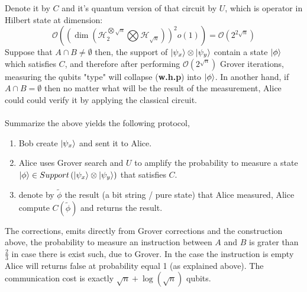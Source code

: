 \documentclass{article}
\newcommand{\onotation}[1]{\(\mathcal{O} \left( {#1}  \right) \)}
\newcommand{\ona}[1]{\onotation{#1}}
\begin{document}
Denote it by \( C \) and it's quantum version of that circuit by \( U \), which is operator in Hilbert state at dimension: \[ \mathcal{O} \left( \left( \dim \left( \mathcal{H}_{2}^{\bigotimes \sqrt{n}} \bigotimes \mathcal{H}_{\sqrt{n}} \right) \right) ^2 o(1) \right) = \mathcal{O} \left( 2^{2\sqrt{n}}  \right)  \]
Suppose that \( A \cap B \neq \emptyset \) then, the support of \( \ket{\psi_x} \otimes \ket{\psi_y} \) contain a state \( \ket{\phi} \) which satisfies \(C\), and therefore  after performing \ona{ 2^{ \sqrt{n}}} Grover iterations, measuring the qubits "type" will collapse (\textbf{w.h.p}) into \( \ket{\phi} \). In another hand, if \( A \cap B = \emptyset \) then no matter what will be the result of the measurement, Alice could could verify it by applying the classical circuit. 
\paragraph{}Summarize the above yields the following protocol,
\begin{enumerate}
    \item Bob create \( \ket{\psi_x} \) and sent it to Alice.
    \item Alice uses Grover search and \(U\) to amplify the probability to measure a state \( \ket{\phi} \in Support \left(   \ket{\psi_x} \otimes \ket{\psi_y}  \right) \) that satisfies \(C\).
    \item denote by \( \tilde{\phi} \) the result (a bit string / pure state) that Alice measured, Alice compute \(C\left(\tilde{\phi}\right) \) and returns the result. 
\end{enumerate}
The corrections, emits directly from Grover corrections and the construction above, the probability to measure an instruction between \(A\) and \(B\) is grater than \( \frac{2}{3} \) in case there is exist such, due to Grover. In the case the instruction is empty Alice will returns false at probability equal 1 (as explained above). The communication cost is exactly  \( \sqrt{n} + \log(\sqrt{n}) \) qubits.  
\end{document}
